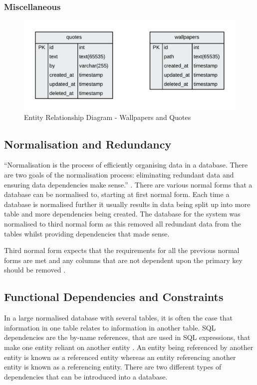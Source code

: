 \subsubsection{Miscellaneous}
\begin{figure}[H]
  \centering
  \includegraphics[width=1.0\textwidth]{Images/Design/Database/Miscellaneous}
  \caption{Entity Relationship Diagram - Wallpapers and Quotes} \label{fig:ERD_Miscellaneous}
\end{figure}

\subsection{Normalisation and Redundancy}
\label{SubSection:Database_Normalisation}
``Normalisation is the process of efficiently organising data in a database. There are two goals of the normalisation process: eliminating redundant data and ensuring data dependencies make sense.'' \cite{Databases:NormalisationBasics}. There are various normal forms that a database can be normalised to, starting at first normal form. Each time a database is normalised further it usually results in data being split up into more table and more dependencies being created. The database for the system was normalised to third normal form as this removed all redundant data from the tables whilst providing dependencies that made sense.


Third normal form expects that the requirements for all the previous normal forms are met and any columns that are not dependent upon the primary key should be removed \cite{Databases:NormalisationBasics}.

\subsection{Functional Dependencies and Constraints}
\label{SubSection:Database_Constraints}
In a large normalised database with several tables, it is often the case that information in one table relates to information in another table. SQL dependencies are the by-name references, that are used in SQL expressions, that make one entity reliant on another entity \cite{Microsoft:Dependencies}. An entity being referenced by another entity is known as a referenced entity whereas an entity referencing another entity is known as a referencing entity. There are two different types of dependencies that can be introduced into a database.

